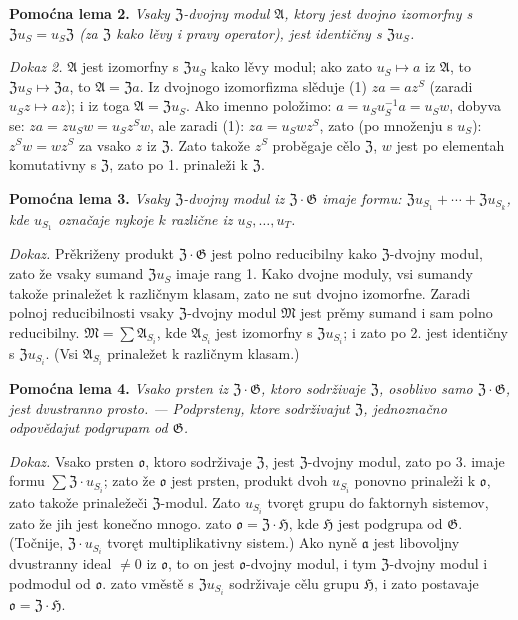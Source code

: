 \documentclass[11pt]{article}
\begin{document}
\noindent\textbf{Pomoćna lema 2.} \emph{Vsaky \(\mathfrak Z\)-dvojny modul \(\mathfrak A\), ktory jest dvojno izomorfny s \(\mathfrak Zu_S=u_S\mathfrak Z\) (za \(\mathfrak Z\) kako lěvy i pravy operator), jest identičny s \(\mathfrak Zu_S\).}

\noindent\emph{Dokaz 2.} \(\mathfrak A\) jest izomorfny s \(\mathfrak Zu_S\) kako lěvy modul; ako zato \(u_S\mapsto a\) iz \(\mathfrak A\), to \(\mathfrak Zu_S\mapsto\mathfrak Za\), to \(\mathfrak A=\mathfrak Za\). Iz dvojnogo izomorfizma slěduje (1) \(za=az^S\) (zaradi \(u_Sz\mapsto az\)); i iz toga \(\mathfrak A=\mathfrak Zu_S\). Ako imenno položimo: \(a=u_Su_S^{-1}a=u_Sw\), dobyva se: \(za=zu_Sw=u_Sz^Sw\), ale zaradi (1): \(za=u_Swz^S\), zato (po množenju s \(u_S\)): \(z^Sw=wz^S\) za vsako \(z\) iz \(\mathfrak Z\). Zato takože \(z^S\) proběgaje cělo \(\mathfrak Z\), \(w\) jest po elementah komutativny s \(\mathfrak Z\), zato po 1. prinaleži k \(\mathfrak Z\).

\noindent\textbf{Pomoćna lema 3.} \emph{Vsaky \(\mathfrak Z\)-dvojny modul iz \(\mathfrak Z\cdot\mathfrak G\) imaje formu: \(\mathfrak Zu_{S_1}+\cdots+\mathfrak Zu_{S_k}\), kde \(u_{S_1}\) označaje nykoje \(k\) različne iz \(u_S,\ldots,u_T\).}

\noindent\emph{Dokaz.} Prěkriženy produkt \(\mathfrak Z\cdot\mathfrak G\) jest polno reducibilny kako \(\mathfrak Z\)-dvojny modul, zato že vsaky sumand \(\mathfrak Zu_S\) imaje rang 1. Kako dvojne moduly, vsi sumandy takože prinaležet k različnym klasam, zato ne sut dvojno izomorfne. Zaradi polnoj reducibilnosti vsaky \(\mathfrak Z\)-dvojny modul \(\mathfrak M\) jest prěmy sumand i sam polno reducibilny. \(\mathfrak M=\sum\mathfrak A_{S_i}\), kde \(\mathfrak A_{S_i}\) jest izomorfny s \(\mathfrak Zu_{S_i}\); i zato po 2. jest identičny s \(\mathfrak Zu_{S_i}\). (Vsi \(\mathfrak A_{S_i}\) prinaležet k različnym klasam.)

\noindent\textbf{Pomoćna lema 4.} \emph{Vsako prsten iz \(\mathfrak Z\cdot\mathfrak G\), ktoro sodrživaje \(\mathfrak Z\), osoblivo samo \(\mathfrak Z\cdot\mathfrak G\), jest dvustranno prosto. --- Podprsteny, ktore sodrživajut \(\mathfrak Z\), jednoznačno odpovědajut podgrupam od \(\mathfrak G\).}

\noindent\emph{Dokaz.} Vsako prsten \(\mathfrak o\), ktoro sodrživaje \(\mathfrak Z\), jest \(\mathfrak Z\)-dvojny modul, zato po 3. imaje formu \(\sum\mathfrak Z\cdot u_{S_i}\); zato že \(\mathfrak o\) jest prsten, produkt dvoh \(u_{S_i}\) ponovno prinaleži k \(\mathfrak o\), zato takože prinaležeči \(\mathfrak Z\)-modul. Zato \(u_{S_i}\) tvoręt grupu do faktornyh sistemov, zato že jih jest konečno mnogo. zato \(\mathfrak o=\mathfrak Z\cdot\mathfrak H\), kde \(\mathfrak H\) jest podgrupa od \(\mathfrak G\). (Točnije, \(\mathfrak Z\cdot u_{S_i}\) tvoręt multiplikativny sistem.) Ako nyně \(\mathfrak a\) jest libovoljny dvustranny ideal \(\neq0\) iz \(\mathfrak o\), to on jest \(\mathfrak o\)-dvojny modul, i tym \(\mathfrak Z\)-dvojny modul i podmodul od \(\mathfrak o\). zato vměstě s \(\mathfrak Zu_{S_i}\) sodrživaje cělu grupu \(\mathfrak H\), i zato postavaje \(\mathfrak o=\mathfrak Z\cdot\mathfrak H\).
\end{document}
